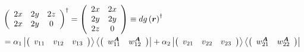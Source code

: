 \documentclass[aps,preprint]{revtex4}%
\begin{document}
\begin{align}
&  \left(
\begin{array}
[c]{ccc}%
2x & 2y & 2z\\
2x & 2y & 0
\end{array}
\right)  ^{\dagger}=\left(
\begin{array}
[c]{cc}%
2x & 2x\\
2y & 2y\\
2z & 0
\end{array}
\right)  \equiv dg\left(  \boldsymbol{r}\right)  ^{\dagger}\nonumber\\
&  =\alpha_{1}\left\vert \left(
\begin{array}
[c]{ccc}%
v_{11} & v_{12} & v_{13}%
\end{array}
\right)  \right\rangle \left\langle \left(
\begin{array}
[c]{cc}%
w_{11}^{\boldsymbol{A}} & w_{12}^{\boldsymbol{A}}%
\end{array}
\right)  \right\vert +\alpha_{2}\left\vert \left(
\begin{array}
[c]{ccc}%
v_{21} & v_{22} & v_{23}%
\end{array}
\right)  \right\rangle \left\langle \left(
\begin{array}
[c]{cc}%
w_{21}^{\boldsymbol{A}} & w_{22}^{\boldsymbol{A}}%
\end{array}
\right)  \right\vert
\end{align}%
\end{document}
